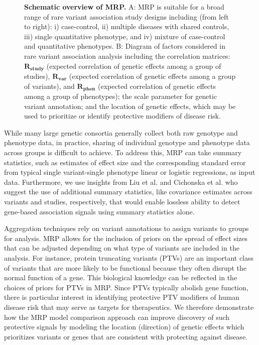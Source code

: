 \begin{figure}[!h]
\caption{{\bf Schematic overview of MRP.}
A: MRP is suitable for a broad range of rare variant association study designs including (from left to right): i) case-control, ii) multiple diseases with shared controls, iii) single quantitative phenotype, and iv) mixture of case-control and quantitative phenotypes. B: Diagram of factors considered in rare variant association analysis including the correlation matrices: $\mathbf{R_{\textrm{study}}}$  (expected correlation of genetic effects among a group of studies), $\mathbf{R_{\textrm{var}}}$ (expected correlation of genetic effects among a group of variants), and $\mathbf{R_{\textrm{phen}}}$ (expected correlation of genetic effects among a group of phenotypes); the scale parameter for genetic variant annotation; and the location of genetic effects, which may be used to prioritize or identify protective modifiers of disease risk.}
\label{overview}
\end{figure}

While many large genetic consortia generally collect both raw genotype and phenotype data, in practice, sharing of individual genotype and phenotype data across groups is difficult to achieve. To address this, MRP can take summary statistics, such as estimates of effect size and the corresponding standard error from typical single variant-single phenotype linear or logistic regressions, as input data. Furthermore, we use insights from Liu et al.\cite{liu2014meta} and Cichonska et al.\cite{cichonska2016metacca} who suggest the use of additional summary statistics, like covariance estimates across variants and studies, respectively, that would enable lossless ability to detect gene-based association signals using summary statistics alone.  

Aggregation techniques rely on variant annotations to assign variants to groups for analysis. MRP allows for the inclusion of priors on the spread of effect sizes that can be adjusted depending on what type of variants are included in the analysis. For instance, protein truncating variants (PTVs)\cite{rivas2013assessing,rivas2015effect} are an important class of variants that are more likely to be functional because they often disrupt the normal function of a gene. This biological knowledge can be reflected in the choices of priors for PTVs in MRP. Since PTVs typically abolish gene function, there is particular interest in identifying protective PTV modifiers of human disease risk that may serve as targets for therapeutics\cite{pcsk9,cohen2006sequence,sullivan2012effect}. We therefore demonstrate how the MRP model comparison approach can improve discovery of such protective signals by modeling the location (direction) of genetic effects which prioritizes variants or genes that are consistent with protecting against disease. 


